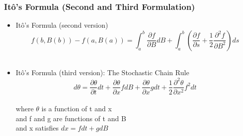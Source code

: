 \begin{frame}
  \frametitle{It\^o's Formula (Second and Third Formulation)}
  \begin{itemize}

  \item  It\^o's Formula (second version) $$f(b,B(b))-f(a,B(a))=\int_{a}^{b}{\frac{\partial f}{\partial B} dB}+\int_{a}^{b}{(\frac{\partial f}{\partial s}+\frac{1}{2}\frac{\partial ^2 f}{\partial B^2}) ds}$$\\
  \item  It\^o's Formula (third version): The Stochastic Chain Rule $$d\theta=\frac{\partial\theta}{\partial t}dt+\frac{\partial\theta}{\partial x}f dB+\frac{\partial\theta}{\partial x}g dt+\frac{1}{2}\frac{\partial^2\theta}{\partial x^2}f^2dt$$\\
  where $\theta$ is a function of t and x\\
  and f and g are functions of t and B\\
  and x satisfies $dx=fdt+gdB$

  \end{itemize}
  
\end{frame}








